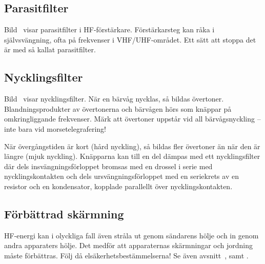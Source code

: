\subsection{Parasitfilter}

Bild~ visar parasitfilter i HF-förstärkare.
Förstärkarsteg kan råka i självsvängning, ofta på frekvenser i VHF/UHF-området.
Ett sätt att stoppa det är med så kallat parasitfilter.

\subsection{Nycklingsfilter}
\label{Nycklingsfilter}

Bild~ visar nycklingsfilter.
När en bärvåg nycklas, så bildas övertoner.
Blandningsprodukter av övertonerna och bärvågen hörs som knäppar på
omkringliggande frekvenser.
Märk att övertoner uppstår vid all bärvågsnyckling -- inte bara vid
morsetelegrafering!

När övergångstiden är kort (hård nyckling), så bildas fler övertoner
än när den är längre (mjuk nyckling).
Knäpparna kan till en del dämpas med ett nycklingsfilter där dels
insvängningsförloppet bromsas med en drossel i serie med nycklingskontakten och
dels ursvängningsförloppet med en seriekrets av en resistor och en kondensator,
kopplade parallellt över nycklingskontakten.

\subsection{Förbättrad skärmning}

HF-energi kan i olyckliga fall även stråla ut genom sändarens hölje
och in genom andra apparaters hölje.
Det medför att apparaternas skärmningar och jordning måste förbättras.
Följ då elsäkerhetsbestämmelserna!
Se även avsnitt~,
 samt
.

